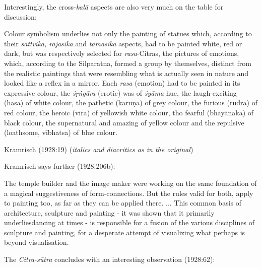 Interestingly, the cross-\textsl{kalā} aspects are also very much on the table for discussion:

\begin{myquote}
Colour symbolism underlies not only the painting of statues which, according to their \textsl{sāttvika, rājasika} and \textsl{tāmasika} aspects, had to be painted white, red or dark, but was respectively selected for \textsl{rasa}-Citras, the pictures of emotions, which, according to the Silparatna, formed a group by themselves, distinct from the realistic paintings that were resembling what is actually seen in nature and looked like a reflex in a mirror. Each \textsl{rasa} (emotion) had to be painted in its expressive colour, the \textsl{śṛṅgāra} (erotic) was of \textsl{śyāma} hue, the laugh-exciting (hāsa) of white colour, the pathetic (karuṇa) of grey colour, the furious (rudra) of red colour, the heroic (vīra) of yellowish white colour, tho fearful (bhayānaka) of black colour, the supernatural and amazing of yellow colour and the repulsive (loathsome, vībhatsa) of blue colour.

\hfill Kramrisch (1928:19) (\textsl{italics and diacritics as in the original})
\end{myquote}

Kramrisch says further (1928:206b):

\begin{myquote}
The temple builder and the image maker were working on the same foundation of a magical suggestiveness of form-connections. But the rules valid for both, apply to painting too, as far as they can be applied there. ... This common basis of architecture, sculpture and painting - it was shown that it primarily underliesdancing at times - is responsible for a fusion of the various disciplines of sculpture and painting, for a desperate attempt of visualizing what perhaps is beyond visualisation.
\end{myquote}

The \textsl{Citra-sūtra} concludes with an interesting observation (1928:62): 

